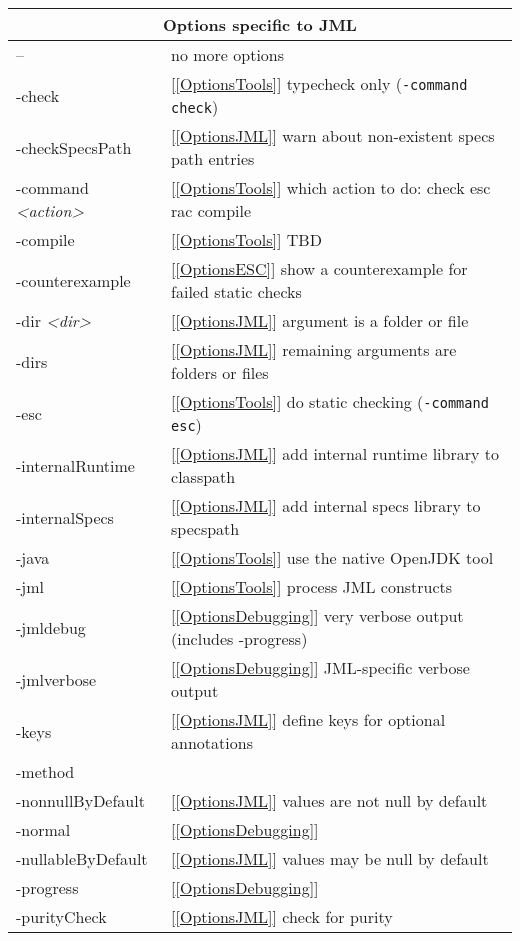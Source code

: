 \begin{table} \small
\parbox{.5\textwidth}{
\begin{tabular}{|l|p{1.4in}|}
\hline
\multicolumn{2}{|c|}{Options specific to JML} \\
\hline
-- & no more options \\ \hline
-check & [\ref{OptionsTools}] typecheck only ({\tt -command check})\\ \hline
-checkSpecsPath & [\ref{OptionsJML}] warn about non-existent specs path entries\\ \hline
-command {\it <action>}& [\ref{OptionsTools}] which action to do: check esc rac compile\\ \hline
-compile & [\ref{OptionsTools}] TBD\\ \hline
-counterexample & [\ref{OptionsESC}] show a counterexample for failed static checks\\ \hline
-dir {\it <dir>} & [\ref{OptionsJML}] argument is a folder or file \\ \hline
-dirs & [\ref{OptionsJML}] remaining arguments are folders or files\\ \hline
-esc & [\ref{OptionsTools}] do static checking ({\tt -command esc}) \\ \hline
-internalRuntime & [\ref{OptionsJML}] add internal runtime library to classpath \\ \hline
-internalSpecs & [\ref{OptionsJML}] add internal specs library to specspath \\ \hline
-java & [\ref{OptionsTools}] use the native OpenJDK tool\\ \hline
-jml & [\ref{OptionsTools}] process JML constructs \\ \hline
-jmldebug & [\ref{OptionsDebugging}] very verbose output (includes -progress) \\ \hline
-jmlverbose & [\ref{OptionsDebugging}] JML-specific verbose output\\ \hline
-keys & [\ref{OptionsJML}] define keys for optional annotations \\ \hline
-method & \\ \hline
-nonnullByDefault & [\ref{OptionsJML}] values are not null by default \\ \hline
-normal & [\ref{OptionsDebugging}] \\ \hline
-nullableByDefault & [\ref{OptionsJML}] values may be null by default\\ \hline
-progress & [\ref{OptionsDebugging}] \\ \hline
-purityCheck & [\ref{OptionsJML}] check for purity \\ \hline

\end{tabular}}
\end{table}
